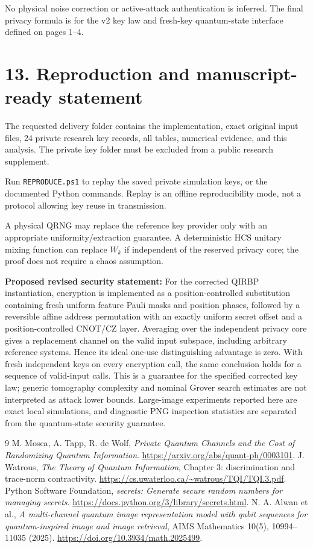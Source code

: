 \documentclass[11pt,a4paper]{article}
\begin{document}
No physical noise correction or active-attack authentication is inferred. The final privacy formula is for the v2 key law and fresh-key quantum-state interface defined on pages 1--4.

\newpage
\section*{13. Reproduction and manuscript-ready statement}
The requested delivery folder contains the implementation, exact original input files, 24 private research key records, all tables, numerical evidence, and this analysis. The private key folder must be excluded from a public research supplement.

Run \texttt{REPRODUCE.ps1} to replay the saved private simulation keys, or the documented Python commands. Replay is an offline reproducibility mode, not a protocol allowing key reuse in transmission.

A physical QRNG may replace the reference key provider only with an appropriate uniformity/extraction guarantee. A deterministic HCS unitary mixing function can replace \(W_k\) if independent of the reserved privacy core; the proof does not require a chaos assumption.

\textbf{Proposed revised security statement:}
{\color{red}
For the corrected QIRBP instantiation, encryption is implemented as a position-controlled substitution containing fresh uniform feature Pauli masks and position phases, followed by a reversible affine address permutation with an exactly uniform secret offset and a position-controlled CNOT/CZ layer. Averaging over the independent privacy core gives a replacement channel on the valid input subspace, including arbitrary reference systems. Hence its ideal one-use distinguishing advantage is zero. With fresh independent keys on every encryption call, the same conclusion holds for a sequence of valid-input calls. This is a guarantee for the specified corrected key law; generic tomography complexity and nominal Grover search estimates are not interpreted as attack lower bounds. Large-image experiments reported here are exact local simulations, and diagnostic PNG inspection statistics are separated from the quantum-state security guarantee.
}

\begin{thebibliography}{9}
M. Mosca, A. Tapp, R. de Wolf, \emph{Private Quantum Channels and the Cost of Randomizing Quantum Information}.
\url{https://arxiv.org/abs/quant-ph/0003101}.
J. Watrous, \emph{The Theory of Quantum Information}, Chapter 3: discrimination and trace-norm contractivity.
\url{https://cs.uwaterloo.ca/~watrous/TQI/TQI.3.pdf}.
Python Software Foundation, \emph{secrets: Generate secure random numbers for managing secrets}.
\url{https://docs.python.org/3/library/secrets.html}.
N. A. Alwan et al., \emph{A multi-channel quantum image representation model with qubit sequences for quantum-inspired image and image retrieval}, AIMS Mathematics 10(5), 10994--11035 (2025).
\url{https://doi.org/10.3934/math.2025499}.
\end{thebibliography}
\end{document}

